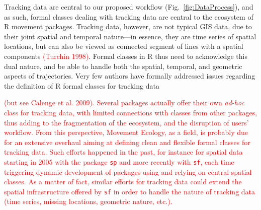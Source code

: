\documentclass[a4paper,12pt]{article}
\newcommand{\Rpkg}[1]{\texttt{#1}}
\begin{document}
Tracking data are central to our proposed workflow (Fig.~\ref{fig:DataProcess}), and as such, formal classes dealing with tracking data are central to the ecosystem of R movement packages. Tracking data, however, are not typical GIS data, due to their joint spatial and temporal nature---in essence, they are time series of spatial locations, but can also be viewed as connected segment of lines with a spatial components \textcolor{red}{(Turchin 1998)}. Formal classes in R thus need to acknowledge this dual nature, and be able to handle both the spatial, temporal, and geometric aspects of trajectories. Very few authors have formally addressed issues regarding the definition of R formal classes for tracking data \textcolor{red}{(but see Calenge et al. 2009). Several packages actually offer their own \emph{ad-hoc} class for tracking data, with limited connections with classes from other packages, thus adding to the fragmentation of the ecosystem, and the disruption of users' workflow. From this perspective, Movement Ecology, as a field, is probably due for an extensive overhaul aiming at defining clean and flexible formal classes for tracking data. Such efforts happened in the past, for instance for spatial data starting in 2005 with the package \Rpkg{sp} and more recently with \Rpkg{sf}, each time triggering dynamic development of packages using and relying on central spatial classes. As a matter of fact, similar efforts for tracking data could extend the spatial infrastructure offered by \Rpkg{sf} in order to handle the nature of tracking data (time series, missing locations, geometric nature, etc.).

% 
%   


}
\end{document}
